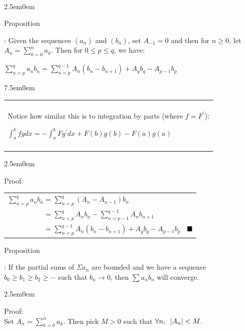 \documentclass{book}
\newcommand{\hTwo}{%
   \color{MidnightBlue}%
   \fontsize{13}{15}\selectfont%
}
\newcommand{\hThree}{%
   \color{PineGreen}
   \fontsize{13}{15}\selectfont%
}
\newcommand{\teachComment}{
   \color{Orange}%
   \fontsize{12}{14}\selectfont%
}
\newenvironment{myIndent}{%
   \begin{adjustwidth}{2.5em}{0em}%
}{%
   \end{adjustwidth}%
}
\newenvironment{myTindent}{%
   \begin{adjustwidth}{7.5em}{0em}%
}{%
   \end{adjustwidth}%
}
\newcommand{\retTwo}{\hfill\bigbreak}
\newcommand{\myHS}{ \hspace{0.5em}}
\newcounter{PropNumber}
\newcommand{\propCount}[1][1]{%
   \addtocounter{PropNumber}{#1}%
   \thePropNumber%
}
\newcommand{\mySepTwo}[1][.]{%
   {\noindent\color{#1}{\rule{6.5in}{0.5mm}}}\\%
}
\newenvironment{myClosureOne}[2][.]{%
   \color{#1}%
   \begin{tabular}{|p{#2in}|} \hline \\%
}{%
   \\ [-6pt] \\ \hline \end{tabular}%
}
\begin{document}
   \mySepTwo[Purple]

   {\begin{myIndent} \hTwo
      Proposition \propCount: Given the sequences $(a_n)$ and $(b_n)$, set $A_{-1} = 0$ and then for $n \geq 0$, let $A_n = \sum\limits_{k=0}^n{a_k}$. Then for $0 \leq p \leq q$, we have: 
      
      {\centering $\sum\limits_{n=p}^{q}{a_nb_n} = \sum\limits_{n=p}^{q-1}{A_n(b_n - b_{n+1})} + A_qb_q - A_{p-1}b_p$ \retTwo\par}

      
      {\begin{myTindent} \teachComment
         \begin{myClosureOne}{4.5}
            Notice how similar this is to integration by parts (where $f = F^\prime$):\newline
            
            {\centering ${\displaystyle \int_a^b{fgdx} = -\int_a^b{Fg^\prime dx} + F(b)g(b) - F(a)g(a) }$ \par}
         \end{myClosureOne}
      \end{myTindent}}

      \newpage
      
      {\begin{myIndent} \hThree
         Proof:\\ [6pt]
         \begin{tabular}{l}
            $\sum\limits_{n=p}^{q}{a_nb_n} = 
            \sum\limits_{n=p}^{q}{(A_n - A_{n-1})b_n}$ \\
            $\phantom{\sum\limits_{n=p}^{q}{a_nb_n}} = 
            \sum\limits_{n=p}^{q}{A_nb_n} - \sum\limits_{n=p-1}^{q-1}{A_{n}b_{n+1}}$ \\
            $\phantom{\sum\limits_{n=p}^{q}{a_nb_n}} = 
            \sum\limits_{n=p}^{q-1}{A_n(b_n - b_{n+1})} + A_qb_q - A_{p-1}b_p$ $\myHS \blacksquare$
         \end{tabular}
      \end{myIndent}} \retTwo

      Proposition \propCount: If the partial sums of $\Sigma a_n$ are bounded and we have a sequence $b_0 \geq b_1 \geq b_2 \geq \cdots$ such that $b_n \rightarrow 0$, then $\sum{a_nb_n}$ will converge.

      {\begin{myIndent} \hThree
         Proof:\\
         Set $A_n = \sum\limits_{k=0}^n{a_k}$. Then pick $M > 0$ such that $\forall n, \myHS |A_n| < M$. \retTwo


\end{myIndent}}
\end{myIndent}}
\end{document}
